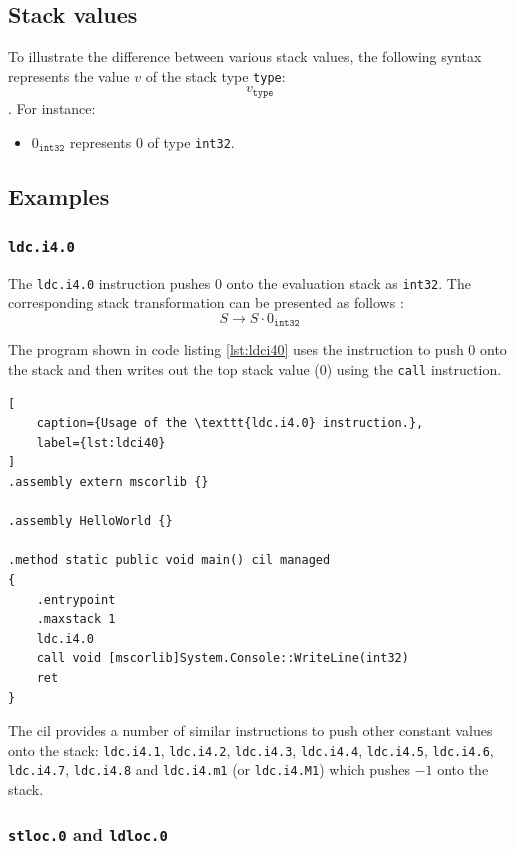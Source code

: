 \documentclass{article}
\numberwithin{equation}{section}
\newcommand{\sval}[2] {
	#1_\texttt{#2}
}
\begin{document}
\subsection{Stack values}

To illustrate the difference between various stack values, the following syntax represents the value $v$ of the stack type \texttt{type}:
$$
	\sval{v}{type}
$$.
For instance:
\begin{itemize}
	\item{$\sval{0}{int32}$ represents $0$ of type \texttt{int32}}.
\end{itemize}

\subsection{Examples}
\label{sec:instruction_examples}

\subsubsection{\texttt{ldc.i4.0}}
\label{sec:desc_ldci40}

The \texttt{ldc.i4.0} instruction pushes $0$ onto the evaluation stack as \texttt{int32}. The corresponding stack transformation can be presented as follows \cite{ecmaStandard}:
$$
	S \rightarrow S \cdot 0_\texttt{int32}
$$

The program shown in code listing \ref{lst:ldci40} uses the instruction to push $0$ onto the stack and then writes out the top stack value ($0$) using the \texttt{call} instruction.

\begin{lstlisting}[
	caption={Usage of the \texttt{ldc.i4.0} instruction.},
	label={lst:ldci40}
]
.assembly extern mscorlib {}

.assembly HelloWorld {}

.method static public void main() cil managed
{
	.entrypoint
	.maxstack 1
	ldc.i4.0
	call void [mscorlib]System.Console::WriteLine(int32)
	ret
}
\end{lstlisting}

The \acrshort{cil} provides a number of similar instructions to push other constant values onto the stack: \texttt{ldc.i4.1}, \texttt{ldc.i4.2}, \texttt{ldc.i4.3}, \texttt{ldc.i4.4}, \texttt{ldc.i4.5}, \texttt{ldc.i4.6}, \texttt{ldc.i4.7}, \texttt{ldc.i4.8} and \texttt{ldc.i4.m1} (or \texttt{ldc.i4.M1}) which pushes $-1$ onto the stack.

\subsubsection{\texttt{stloc.0} and \texttt{ldloc.0}}
\label{sec:desc_stloc0_ldloc0}
\end{document}
